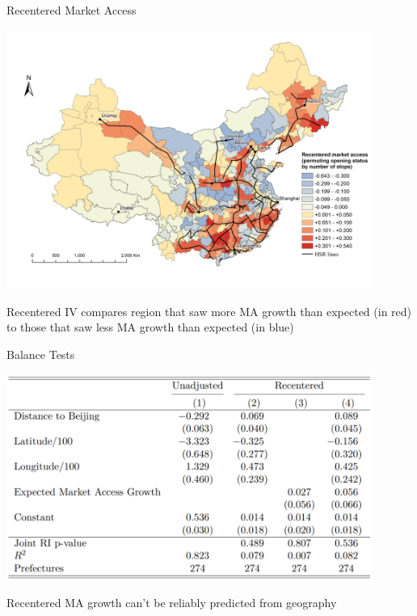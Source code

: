 \documentclass[11pt,english]{beamer}
\begin{document}
\begin{frame}{Recentered Market Access}

\begin{center}
	\includegraphics[width=0.9\textwidth]{figures/NlinkRecentered2016.png}
\end{center}

\vspace{-0.3cm}
Recentered IV compares region that saw more MA growth than expected (in red) to those that saw less MA growth than expected (in blue)

\end{frame}

\begin{frame}{Balance Tests}

\begin{center}
	\includegraphics[width=0.9\textwidth]{figures/spec_test.png}
\end{center}

Recentered MA growth can't be reliably predicted from geography

\end{frame}
\end{document}
